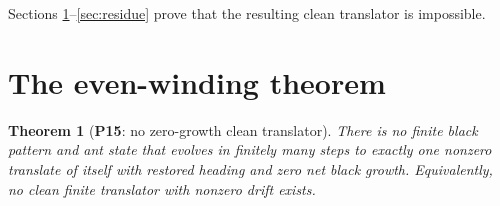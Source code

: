 \documentclass[11pt,reqno]{amsart}
\theoremstyle{plain}
\newtheorem{theorem}{Theorem}[section]
\theoremstyle{definition}
\newcommand{\PN}[1]{\textbf{P#1}}
\begin{document}
Sections \ref{sec:evenwinding}--\ref{sec:residue} prove that the resulting clean
translator is impossible.

\section{The even-winding theorem}\label{sec:evenwinding}

\begin{theorem}[\PN{15}: no zero-growth clean translator]\label{thm:evenwinding}
There is no finite black pattern and ant state that evolves in finitely many
steps to exactly one nonzero translate of itself with restored heading and zero
net black growth. Equivalently, no clean finite translator with nonzero drift
exists.
\end{theorem}
\end{document}
